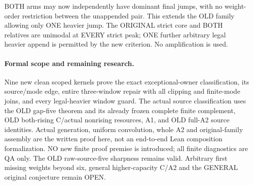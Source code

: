 BOTH arms may now independently have dominant final jumps,
with no weight-order restriction between the unappended pair.
This extends the OLD family allowing only ONE heavier jump.
The ORIGINAL strict core and BOTH relatives are unimodal at
EVERY strict peak; ONE further arbitrary legal heavier append
is permitted by the new criterion. No amplification is used.

\paragraph{Formal scope and remaining research.}
Nine new clean scoped kernels prove the exact exceptional-owner
classification, its source/mode edge, entire three-window repair
with all clipping and finite-mode joins, and every legal-heavier
window guard. The actual source classification uses the OLD gap-five
theorem and its already frozen complete finite complement, OLD
both-rising C/actual nonrising resources, A1, and OLD full-A2 source
identities. Actual generation, uniform convolution, whole A2 and
original-family assembly are the written proof here, not an
end-to-end Lean composition formalization. NO new finite proof
premise is introduced; all finite diagnostics are QA only.
The OLD raw-source-five sharpness remains valid. Arbitrary
first missing weights beyond six, general higher-capacity C/A2
and the GENERAL original conjecture remain OPEN.
